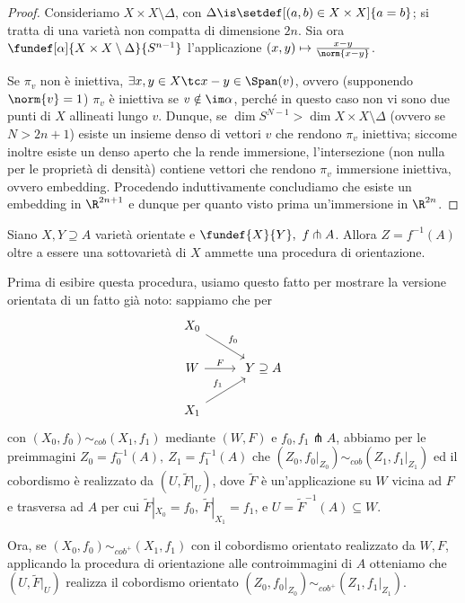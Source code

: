 \begin{proof}
Consideriamo $X \times X \setminus \Delta$, con $\Delta \is \setdef[(a,b) \in X \times X]{a=b}$; si tratta di una varietà non compatta di dimensione $2n$. Sia ora $\fundef[\alpha]{X \times X \setminus \Delta}{S^{n-1}}$ l'applicazione $(x,y) \mapsto \frac{x-y}{\norm{x-y}} $.

Se $\pi_v$ non è iniettiva, $\exists x,y \in X \tc x-y \in \Span(v)$, ovvero (supponendo \wlg $\norm{v} = 1$) $\pi_v$ è iniettiva se $v \notin \im \alpha$, perché in questo caso non vi sono due punti di $X$ allineati lungo $v$. Dunque, se $\dim S^{N-1} > \dim X \times X \setminus \Delta$ (ovvero se $N > 2n+1$) esiste un insieme denso di vettori $v$ che rendono $\pi_v$ iniettiva; siccome inoltre esiste un denso aperto che la rende immersione, l'intersezione (non nulla per le proprietà di densità) contiene vettori che rendono $\pi_v$ immersione iniettiva, ovvero embedding. Procedendo induttivamente concludiamo che esiste un embedding in $\R^{2n+1}$ e dunque per quanto visto prima un'immersione in $\R^{2n}$.
\end{proof}


\begin{prop}
Siano $X, Y \supseteq A$ varietà orientate e $\fundef{X}{Y}, \ f \pitchfork A$.
Allora $Z = f^{-1}(A)$ oltre a essere una sottovarietà di $X$ ammette una procedura di orientazione.
\end{prop}

Prima di esibire questa procedura, usiamo questo fatto per mostrare la versione orientata di un fatto già noto: sappiamo che per \[
\begin{tikzcd}
X_0 \arrow[dr, "f_0"] & \\
W \arrow[r, "F"] & \ Y \supseteq A \\
X_1 \arrow[ur, "f_1"] &
\end{tikzcd} \]
con $(X_0, f_0) \sim_{cob} (X_1, f_1)$ mediante $(W,F)$ e $f_0, f_1 \pitchfork A$, abbiamo per le preimmagini $Z_0 = f_0^{-1}(A), \ Z_1 = f_1^{-1}(A)$ che $(Z_0, f_0 |_{Z_0}) \sim_{cob} (Z_1, f_1 |_{Z_1})$ ed il cobordismo è realizzato da $(U, \tilde{F}|_U)$, dove $\tilde{F}$ è un'applicazione su $W$ vicina ad $F$ e trasversa ad $A$ per cui $\tilde{F}|_{X_0} = f_0, \ \tilde{F}|_{X_1} = f_1$, e $U = \tilde{F}^{-1}(A) \subseteq W$.

Ora, se $(X_0, f_0) \sim_{cob^+} (X_1, f_1)$ con il cobordismo orientato realizzato da $W, F$, applicando la procedura di orientazione alle controimmagini di $A$ otteniamo che $(U, \tilde{F}|_U)$ realizza il cobordismo orientato $(Z_0, f_0 |_{Z_0}) \sim_{cob^+} (Z_1, f_1 |_{Z_1})$.

